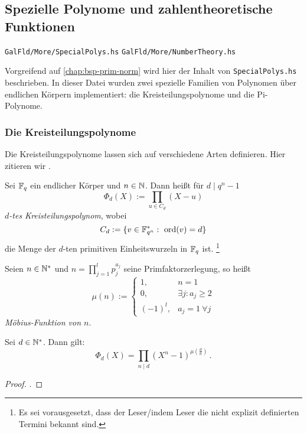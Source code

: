\subsection{Spezielle Polynome und zahlentheoretische Funktionen}

\texttt{GalFld/More/SpecialPolys.hs}
\texttt{GalFld/More/NumberTheory.hs}

Vorgreifend auf \autoref{chap:bsp-prim-norm} wird hier der Inhalt von 
\texttt{SpecialPolys.hs} beschrieben. In dieser Datei wurden zwei spezielle
Familien von Polynomen über endlichen Körpern implementiert: die
Kreisteilungspolynome und die Pi-Polynome.

\subsubsection{Die Kreisteilungspolynome}

Die Kreisteilungspolynome lassen sich auf verschiedene Arten definieren. Hier
zitieren wir \cite[Abschnitt 4]{hach2013eki}.

\begin{definition}[Kreisteilungspolynom]
  Sei $\mathbb{F}_q$ ein endlicher Körper und $n\in \mathbb{N}$. Dann heißt für 
  $d\mid q^n-1$
  \[ \Phi_d(X) := \prod_{u \in C_d} (X-u)\]
  \emph{$d$-tes Kreisteilungspolynom}, wobei
  \[ C_d := \{ v\in \mathbb{F}_{q^n}^\ast:\ \operatorname{ord}(v) = d\}\]
  die Menge der $d$-ten primitiven Einheitswurzeln in $\mathbb{F}_q$ ist.%
  \footnote{Es sei vorausgesetzt, dass der Leser/indem Leser 
  die nicht explizit definierten Termini bekannt sind.}
\end{definition}

\begin{definition}
  Seien $n \in \mathbb{N}^\ast$ und $n = \prod_{j=1}^l p_j^{a_j}$ seine
  Primfaktorzerlegung, so heißt
  \[ \mu(n) := \begin{cases} 1, &n=1\\ 0,& \exists j: a_j \geq 2\\
    (-1)^l, & a_j=1 \ \forall j \end{cases}\]
  \emph{Möbius-Funktion von $n$}.
\end{definition}

\begin{prop}
  Sei $d\in \mathbb{N}^\ast$. Dann gilt: 
  \[ \Phi_d(X) = \prod_{n\mid d} (X^n-1)^{\mu(\frac{d}{n})} \,.\]
\end{prop}
\begin{proof}
  \autocite[Abschnitt 4]{hach2013eki}.
\end{proof}

